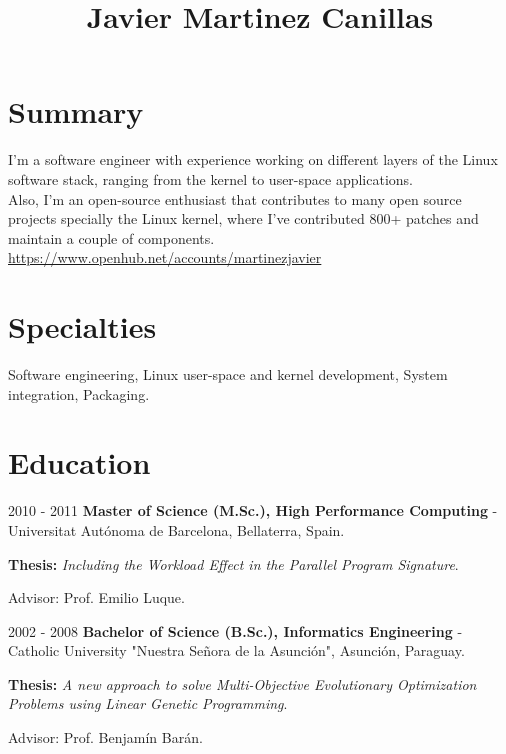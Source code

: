 \documentclass{simplecv}
\begin{document}

\title{Javier Martinez Canillas}

\maketitle

\section{Summary}

I'm a software engineer with experience working on different layers of the Linux software stack,
ranging from the kernel to user-space applications.\\

Also, I'm an open-source enthusiast that contributes to many open source projects specially the
Linux kernel, where I've contributed 800+ patches and maintain a couple of components. \\

\url{https://www.openhub.net/accounts/martinezjavier}

\section{Specialties}

Software engineering, Linux user-space and kernel development, System integration, Packaging.

\section{Education}

\begin{topic}

\item[2010 - 2011] {\bf Master of Science (M.Sc.), High Performance Computing} - Universitat Autónoma de Barcelona, Bellaterra, Spain. 

{\bf Thesis:} \emph{Including the Workload Effect in the Parallel Program Signature}.

Advisor: Prof. Emilio Luque.

\item[2002 - 2008] {\bf Bachelor of Science (B.Sc.), Informatics Engineering} - Catholic University "Nuestra Señora de la Asunción", Asunción, Paraguay. 

{\bf Thesis:} \emph{A new approach to solve Multi-Objective Evolutionary Optimization Problems using Linear Genetic Programming}. 

Advisor: Prof. Benjamín Barán.

\end{topic}
\end{document}
